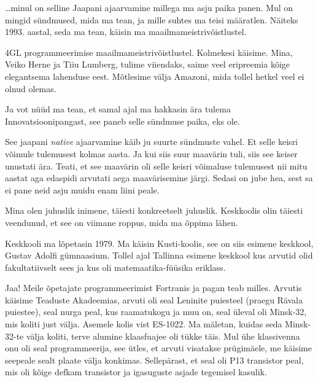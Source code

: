                  

\ldots minul on selline Jaapani ajaarvamine millega ma asju paika panen. Mul on mingid sündmused, mida ma tean, ja mille suhtes ma teisi määratlen. Näiteks 1993. aastal, seda ma tean, käisin ma maailmameistrivõistlustel. 


4GL programmeerimise maailmameistrivõistlustel. Kolmekesi käisime. Mina, Veiko Herne ja Tiiu Lumberg,  tulime viiendaks, saime veel eripreemia  kõige  elegantsema lahenduse eest. Mõtlesime välja Amazoni, mida tollel hetkel veel ei olnud olemas. 

Ja vot nüüd ma tean, et samal ajal ma hakkasin ära tulema Innovatsioonipangast, see paneb selle sündmuse paika, eks ole. 

See jaapani \emph{native} ajaarvamine käib ju suurte sündmuste vahel. Et selle keisri võimule tulemusest kolmas aasta. Ja kui siis suur maavärin tuli, siis see keiser unustati ära. Teati, et see maavärin oli selle keisri võimaluse tulemusest nii mitu aastat aga edaspidi arvutati aega maavärisemine järgi. Sedasi on jube hea, sest sa ei pane neid asju muidu enam liini peale.  


Mina olen juhuslik inimene, täiesti konkreetselt juhuslik. Keskkoolis olin täiesti veendunud, et see on viimane roppus, mida ma õppima lähen. 


Keskkooli ma lõpetasin 1979. Ma käisin Kusti-koolis, see on siis esimene keskkool, Gustav Adolfi gümnaasium. Tollel ajal Tallinna esimene keskkool kus arvutid olid fakultatiivselt sees ja kus oli matemaatika-füüsika eriklass. 


Jaa! Meile õpetajate programmeerimist Fortranis ja pagan teab milles. Arvutis käisime Teaduste Akadeemias, arvuti oli seal Leninite puiesteel (praegu Rävala puiestee), seal nurga peal, kus raamatukogu ja muu on, seal üleval oli Minsk-32, mis koliti just välja. Asemele kolis vist ES-1022. Ma mäletan, kuidas seda Minsk-32-te välja koliti,  terve alumine klaasfuajee oli tükke täis. Mul ühe klassivenna onu oli seal programmeerija, see ütles, et arvuti visatakse prügimäele, me käisime seepeale sealt plaate välja konkimas. Sellepärast, et seal oli P13 transistor peal, mis oli kõige defkam transistor ja igasuguste asjade tegemisel kasulik.

